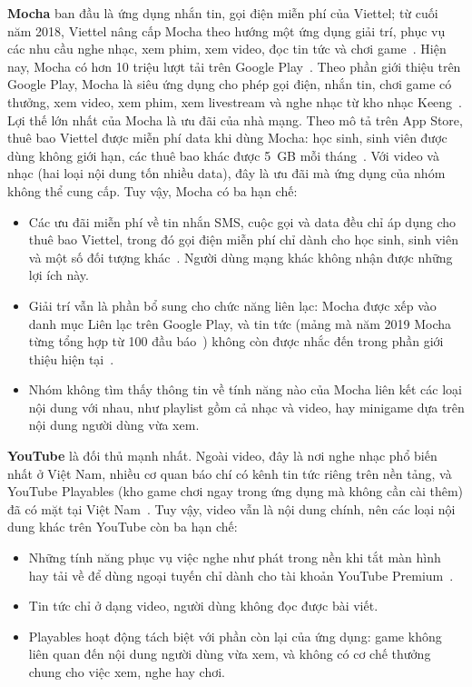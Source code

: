 \textbf{Mocha} ban đầu là ứng dụng nhắn tin, gọi điện miễn phí của Viettel; từ cuối năm 2018, Viettel nâng cấp Mocha theo hướng một ứng dụng giải trí, phục vụ các nhu cầu nghe nhạc, xem phim, xem video, đọc tin tức và chơi game~\cite{sggp-mocha2019}.
Hiện nay, Mocha có hơn 10 triệu lượt tải trên Google Play~\cite{mocha-googleplay}.
Theo phần giới thiệu trên Google Play, Mocha là siêu ứng dụng cho phép gọi điện, nhắn tin, chơi game có thưởng, xem video, xem phim, xem livestream và nghe nhạc từ kho nhạc Keeng~\cite{mocha-googleplay}.
Lợi thế lớn nhất của Mocha là ưu đãi của nhà mạng.
Theo mô tả trên App Store, thuê bao Viettel được miễn phí data khi dùng Mocha: học sinh, sinh viên được dùng không giới hạn, các thuê bao khác được 5~GB mỗi tháng~\cite{mocha-appstore}.
Với video và nhạc (hai loại nội dung tốn nhiều data), đây là ưu đãi mà ứng dụng của nhóm không thể cung cấp.
Tuy vậy, Mocha có ba hạn chế:
\begin{itemize}
    \item Các ưu đãi miễn phí về tin nhắn SMS, cuộc gọi và data đều chỉ áp dụng cho thuê bao Viettel, trong đó gọi điện miễn phí chỉ dành cho học sinh, sinh viên và một số đối tượng khác~\cite{mocha-googleplay, mocha-appstore}. Người dùng mạng khác không nhận được những lợi ích này.
    \item Giải trí vẫn là phần bổ sung cho chức năng liên lạc: Mocha được xếp vào danh mục Liên lạc trên Google Play, và tin tức (mảng mà năm 2019 Mocha từng tổng hợp từ 100 đầu báo~\cite{sggp-mocha2019}) không còn được nhắc đến trong phần giới thiệu hiện tại~\cite{mocha-googleplay}.
    \item Nhóm không tìm thấy thông tin về tính năng nào của Mocha liên kết các loại nội dung với nhau, như playlist gồm cả nhạc và video, hay minigame dựa trên nội dung người dùng vừa xem.
\end{itemize}

\textbf{YouTube} là đối thủ mạnh nhất.
Ngoài video, đây là nơi nghe nhạc phổ biến nhất ở Việt Nam, nhiều cơ quan báo chí có kênh tin tức riêng trên nền tảng, và YouTube Playables (kho game chơi ngay trong ứng dụng mà không cần cài thêm) đã có mặt tại Việt Nam~\cite{youtube-playables}.
Tuy vậy, video vẫn là nội dung chính, nên các loại nội dung khác trên YouTube còn ba hạn chế:
\begin{itemize}
    \item Những tính năng phục vụ việc nghe như phát trong nền khi tắt màn hình hay tải về để dùng ngoại tuyến chỉ dành cho tài khoản YouTube Premium~\cite{youtube-premium}.
    \item Tin tức chỉ ở dạng video, người dùng không đọc được bài viết.
    \item Playables hoạt động tách biệt với phần còn lại của ứng dụng: game không liên quan đến nội dung người dùng vừa xem, và không có cơ chế thưởng chung cho việc xem, nghe hay chơi.
\end{itemize}

